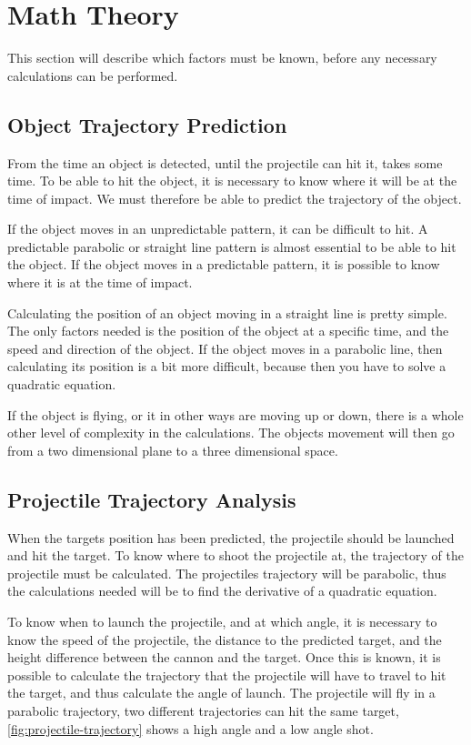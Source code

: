 \section{Math Theory}
\label{maththeory}
This section will describe which factors must be known, before any necessary calculations can be performed.

\subsection{Object Trajectory Prediction}
From the time an object is detected, until the projectile can hit it, takes some time. To be able to hit the object, it is necessary to know where it will be at the time of impact. We must therefore be able to predict the trajectory of the object.

If the object moves in an unpredictable pattern, it can be difficult to hit. A predictable parabolic or straight line pattern is almost essential to be able to hit the object. If the object moves in a predictable pattern, it is possible to know where it is at the time of impact.

Calculating the position of an object moving in a straight line is pretty simple. The only factors needed is the position of the object at a specific time, and the speed and direction of the object. If the object moves in a parabolic line, then calculating its position is a bit more difficult, because then you have to solve a quadratic equation.

If the object is flying, or it in other ways are moving up or down, there is a whole other level of complexity in the calculations. The objects movement will then go from a two dimensional plane to a three dimensional space.

\subsection{Projectile Trajectory Analysis}
When the targets position has been predicted, the projectile should be launched and hit the target. To know where to shoot the projectile at, the trajectory of the projectile must be calculated.
The projectiles trajectory will be parabolic\cite{trajectoryanalysis}, thus the calculations needed will be to find the derivative of a quadratic equation.

To know when to launch the projectile, and at which angle, it is necessary to know the speed of the projectile, the distance to the predicted target, and the height difference between the cannon and the target. Once this is known, it is possible to calculate the trajectory that the projectile will have to travel to hit the target, and thus calculate the angle of launch. The projectile will fly in a parabolic trajectory, two different trajectories can hit the same target, \autoref{fig:projectile-trajectory} shows a high angle and a low angle shot.

